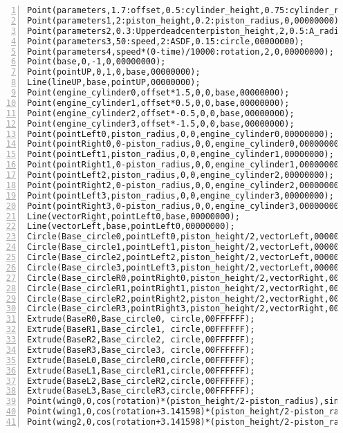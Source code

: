 \begin{lstlisting}[numbers=left]
Point(parameters,1.7:offset,0.5:cylinder_height,0.75:cylinder_radius,00000000);
Point(parameters1,2:piston_height,0.2:piston_radius,0,00000000);
Point(parameters2,0.3:Upperdeadcenterpiston_height,2,0.5:A_radius, 00000000);
Point(parameters3,50:speed,2:ASDF,0.15:circle,00000000);
Point(parameters4,speed*(0-time)/10000:rotation,2,0,00000000);
Point(base,0,-1,0,00000000);
Point(pointUP,0,1,0,base,00000000);
Line(lineUP,base,pointUP,00000000);
Point(engine_cylinder0,offset*1.5,0,0,base,00000000);
Point(engine_cylinder1,offset*0.5,0,0,base,00000000);
Point(engine_cylinder2,offset*-0.5,0,0,base,00000000);
Point(engine_cylinder3,offset*-1.5,0,0,base,00000000);
Point(pointLeft0,piston_radius,0,0,engine_cylinder0,00000000);
Point(pointRight0,0-piston_radius,0,0,engine_cylinder0,00000000);
Point(pointLeft1,piston_radius,0,0,engine_cylinder1,00000000);
Point(pointRight1,0-piston_radius,0,0,engine_cylinder1,00000000);
Point(pointLeft2,piston_radius,0,0,engine_cylinder2,00000000);
Point(pointRight2,0-piston_radius,0,0,engine_cylinder2,00000000);
Point(pointLeft3,piston_radius,0,0,engine_cylinder3,00000000);
Point(pointRight3,0-piston_radius,0,0,engine_cylinder3,00000000);
Line(vectorRight,pointLeft0,base,00000000);
Line(vectorLeft,base,pointLeft0,00000000);
Circle(Base_circle0,pointLeft0,piston_height/2,vectorLeft,00000000);
Circle(Base_circle1,pointLeft1,piston_height/2,vectorLeft,00000000);
Circle(Base_circle2,pointLeft2,piston_height/2,vectorLeft,00000000);
Circle(Base_circle3,pointLeft3,piston_height/2,vectorLeft,00000000);
Circle(Base_circleR0,pointRight0,piston_height/2,vectorRight,00000000);
Circle(Base_circleR1,pointRight1,piston_height/2,vectorRight,00000000);
Circle(Base_circleR2,pointRight2,piston_height/2,vectorRight,00000000);
Circle(Base_circleR3,pointRight3,piston_height/2,vectorRight,00000000);
Extrude(BaseR0,Base_circle0, circle,00FFFFFF);
Extrude(BaseR1,Base_circle1, circle,00FFFFFF);
Extrude(BaseR2,Base_circle2, circle,00FFFFFF);
Extrude(BaseR3,Base_circle3, circle,00FFFFFF);
Extrude(BaseL0,Base_circleR0,circle,00FFFFFF);
Extrude(BaseL1,Base_circleR1,circle,00FFFFFF);
Extrude(BaseL2,Base_circleR2,circle,00FFFFFF);
Extrude(BaseL3,Base_circleR3,circle,00FFFFFF);
Point(wing0,0,cos(rotation)*(piston_height/2-piston_radius),sin(rotation)*(piston_height/2-piston_radius),engine_cylinder0,000000FF);
Point(wing1,0,cos(rotation+3.141598)*(piston_height/2-piston_radius),sin(rotation+3.141598)*(piston_height/2-piston_radius),engine_cylinder1,000000FF);
Point(wing2,0,cos(rotation+3.141598)*(piston_height/2-piston_radius),sin(rotation+3.141598)*(piston_height/2-piston_radius),engine_cylinder2,000000FF);

\end{lstlisting}
